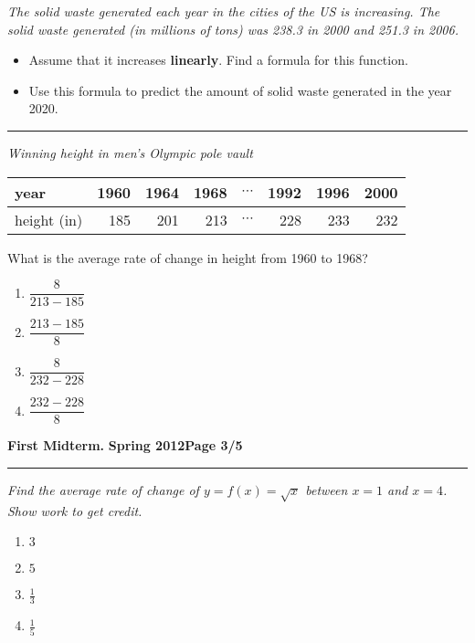 \documentclass[12pt]{article}
\begin{document}
\bigskip
{\problem[10 pts] \em The solid waste generated each year in the
  cities of the US is increasing.  The solid waste generated (in
  millions of tons) was 238.3 in 2000 and 251.3 in 2006.}
\begin{itemize}
\item Assume that it increases {\bf linearly}. Find a formula for
  this function.
\vspace{3.5cm}
\begin{flushright}
\end{flushright}
\item Use this formula to predict the amount of solid waste generated
  in the year 2020.
\vspace{3.5cm}
\begin{flushright}
\end{flushright}
\end{itemize}
\hrule
{\problem[10 pts] \em Winning height in men's Olympic pole vault}
\begin{center}
\begin{tabular}{l|r|r|r|c|r|r|r|}
\hline
year & 1960 & 1964 & 1968 & $\cdots$ & 1992 & 1996 & 2000 \\
\hline
height (in) & 185 & 201 & 213 & $\cdots$ & 228 & 233 & 232 \\
\hline
\end{tabular}
\end{center}
What is the average rate of change in height from 1960 to 1968?
\begin{enumerate}
\item $\dfrac{8}{213-185}$
\item $\dfrac{213-185}{8}$
\item $\dfrac{8}{232-228}$
\item $\dfrac{232-228}{8}$
\end{enumerate}
\newpage

\hfill{\large\bf First Midterm.}\hfill{\large\bf
  Spring 2012}\hfill{\large\bf Page 3/5}\hrule

\bigskip
{\problem[10 pts] \em Find the average rate of change of $y=f(x) =
  \sqrt{x}$ between $x=1$ and $x=4$.  Show work to get credit.}
\begin{enumerate}
\item $3$
\item $5$
\item $\tfrac{1}{3}$
\item $\tfrac{1}{5}$
\end{enumerate}
\end{document}
